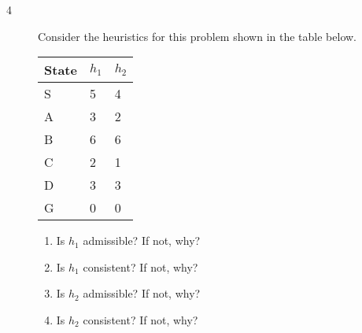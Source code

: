 \documentclass[11pt]{article}
\begin{document}
  \begin{description}

\clearpage

  \item[4] Consider the heuristics for this problem shown in the table below.

     \begin{center}
     \begin{tabular}{|l|l|l|}\hline
     State & $h_1$ & $h_2$ \\ \hline
     S     & 5     & 4     \\ \hline
     A     & 3     & 2     \\ \hline
     B     & 6     & 6     \\ \hline
     C     & 2     & 1     \\ \hline
     D     & 3     & 3     \\ \hline
     G     & 0     & 0     \\ \hline
     \end{tabular}
     \end{center}

     \begin{enumerate}

     \item Is $h_1$ admissible?  If not, why? \\[.5in]

     \item Is $h_1$ consistent?  If not, why? \\[.5in]

     \item Is $h_2$ admissible?  If not, why? \\[.5in]

     \item Is $h_2$ consistent?  If not, why?

     \end{enumerate}

  \end{description}
\end{document}
